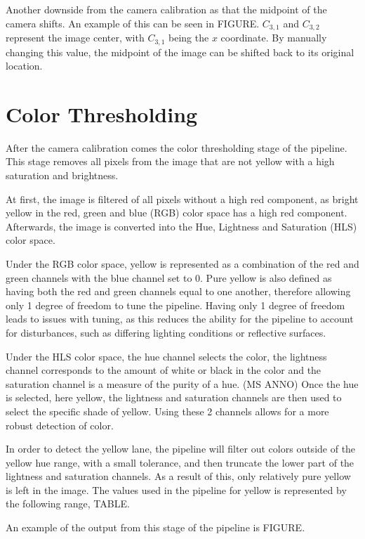 \documentclass[arbeit=studie,oneside,BCOR=12mm]{ArbeitRST}
\begin{document}
Another downside from the camera calibration as that the midpoint of the camera
shifts. An example of this can be seen in FIGURE. $C_{3,1}$ and $C_{3,2}$ 
represent the image center, with $C_{3,1}$ being the $x$ coordinate. By manually
changing this value, the midpoint of the image can be shifted back to its 
original location.

\section{Color Thresholding}

After the camera calibration comes the color thresholding stage of the pipeline.
This stage removes all pixels from the image that are not yellow with a high
saturation and brightness. 

At first, the image is filtered of all pixels without a high red component, as
bright yellow in the red, green and blue (RGB) color space has a high red
component. Afterwards, the image is converted into the Hue, Lightness and
Saturation (HLS) color space. 

Under the RGB color space, yellow is represented as a combination of the red 
and green channels with the blue channel set to 0. Pure yellow is also defined 
as having both the red and green channels equal to one another, therefore 
allowing only 1 degree of freedom to tune the pipeline.  Having only 1 degree 
of freedom leads to issues with tuning, as this reduces the ability for the 
pipeline to account for disturbances, such as differing lighting conditions or 
reflective surfaces.

Under the HLS color space, the hue channel selects the color, the lightness 
channel corresponds to the amount of white or black in the color and the 
saturation channel is a measure of the purity of a hue. (MS ANNO) Once the hue 
is selected, here yellow, the lightness and saturation channels are then used 
to select the specific shade of yellow. Using these 2 channels allows for a 
more robust detection of color.

In order to detect the yellow lane, the pipeline will filter out colors outside 
of the yellow hue range, with a small tolerance, and then truncate the lower 
part of the lightness and saturation channels. As a result of this, only 
relatively pure yellow is left in the image.
The values used in the pipeline for yellow is represented by the following 
range,
TABLE.

An example of the output from this stage of the pipeline is FIGURE.
\end{document}
